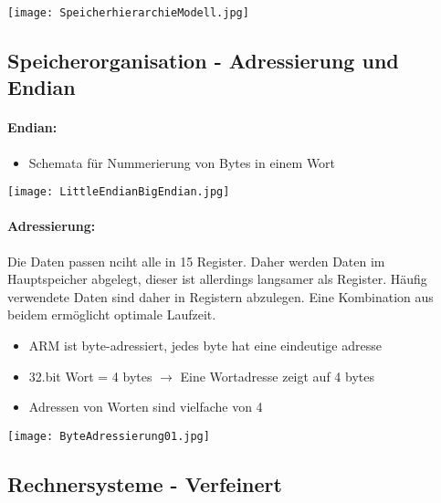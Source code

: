 		\begin{center}
			\texttt{[image: SpeicherhierarchieModell.jpg]}
		\end{center}



	\subsection{Speicherorganisation - Adressierung und Endian}
		\paragraph{Endian:}
		\begin{itemize}
			\item Schemata für Nummerierung von Bytes in einem Wort
		\end{itemize}
		\begin{center}
			\texttt{[image: LittleEndianBigEndian.jpg]}
		\end{center}

		\vspace{0.7cm}

		\paragraph{Adressierung:} Die Daten passen nciht alle in 15 Register. Daher werden Daten 
		im Hauptspeicher abgelegt, dieser ist allerdings langsamer als Register. Häufig
		verwendete Daten sind daher in Registern abzulegen. Eine Kombination aus beidem
		ermöglicht optimale Laufzeit.

		\begin{itemize}
			\item ARM ist byte-adressiert, jedes byte hat eine eindeutige adresse
			\item 32.bit Wort = 4 bytes $\rightarrow$ Eine Wortadresse zeigt auf 4 bytes
			\item Adressen von Worten sind vielfache von 4
		\end{itemize}
		\begin{center}
			\texttt{[image: ByteAdressierung01.jpg]}
		\end{center}



	\subsection{Rechnersysteme - Verfeinert}

